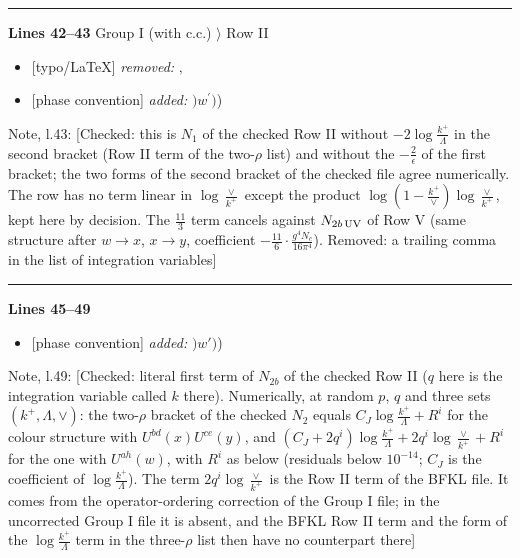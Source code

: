 \documentclass[10pt]{article}
\newenvironment{notebox}{\def\FrameCommand{{\color{notebar}\vrule width 1.5pt}\hspace{6pt}}\MakeFramed{\advance\hsize-\width\FrameRestore}\small}{\endMakeFramed}
\begin{document}
\noindent\rule{\linewidth}{0.3pt}\par\noindent\textbf{Lines 42--43} \quad \textsf{Group I (with c.c.) $\rangle$ Row II} \par
\begin{itemize}[leftmargin=2.2em,itemsep=1pt,topsep=2pt]
\item[\textbf{l.42}] \textsf{\small [typo/LaTeX]} \emph{removed:} $\displaystyle ,$
\item[\textbf{l.42}] \textsf{\small [phase convention]} \emph{added:} $\displaystyle )$$\displaystyle w^\prime)${\color{gray}\small)}
\end{itemize}
\begin{notebox}\textsf{\small Note, l.43:} [Checked: this is $N_{1}$ of the checked Row II without $-2\log\frac{k^{+}}{\Lambda}$ in the second bracket (Row II term of the two-$\rho$ list) and without the $-\frac{2}{\epsilon}$ of the first bracket; the two forms of the second bracket of the checked file agree numerically. The row has no term linear in $\log\frac{\vee}{k^{+}}$ except the product $\log(1-\frac{k^{+}}{\vee})\log\frac{\vee}{k^{+}}$, kept here by decision. The $\frac{11}{3}$ term cancels against $N_{2b\,\rm UV}$ of Row V (same structure after $w\to x$, $x\to y$, coefficient $-\frac{11}{6}\cdot\frac{g^{4}N_{c}}{16\pi^{4}}$). Removed: a trailing comma in the list of integration variables]\end{notebox}
\par
{}\noindent\rule{\linewidth}{0.3pt}\par\noindent\textbf{Lines 45--49} \par
\begin{itemize}[leftmargin=2.2em,itemsep=1pt,topsep=2pt]
\item[\textbf{l.45}] \textsf{\small [phase convention]} \emph{added:} $\displaystyle )$$\displaystyle w')${\color{gray}\small)}
\end{itemize}
\begin{notebox}\textsf{\small Note, l.49:} [Checked: literal first term of $N_{2b}$ of the checked Row II ($q$ here is the integration variable called $k$ there). Numerically, at random $p$, $q$ and three sets $(k^{+},\Lambda,\vee)$: the two-$\rho$ bracket of the checked $N_{2}$ equals $C_{J}\log\frac{k^{+}}{\Lambda}+R^{i}$ for the colour structure with $U^{bd}(x)U^{ce}(y)$, and $(C_{J}+2q^{i})\log\frac{k^{+}}{\Lambda}+2q^{i}\log\frac{\vee}{k^{+}}+R^{i}$ for the one with $U^{ah}(w)$, with $R^{i}$ as below (residuals below $10^{-14}$; $C_{J}$ is the coefficient of $\log\frac{k^{+}}{\Lambda}$). The term $2q^{i}\log\frac{\vee}{k^{+}}$ is the Row II term of the BFKL file. It comes from the operator-ordering correction of the Group I file; in the uncorrected Group I file it is absent, and the BFKL Row II term and the form of the $\log\frac{k^{+}}{\Lambda}$ term in the three-$\rho$ list then have no counterpart there]\end{notebox}
\end{document}
